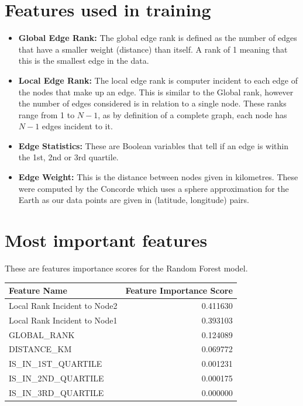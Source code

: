 \documentclass[]{UCD_CS_FYP_Report}
\begin{document}
\section{Features used in training}
\begin{itemize}
    \item \textbf{Global Edge Rank: \newline}
        The global edge rank is defined as the number of edges that have a smaller weight (distance) than itself. A rank of 1 meaning that this is the smallest edge in the data.
    \item \textbf{Local Edge Rank: \newline}
        The local edge rank is computer incident to each edge of the nodes that make up an edge. This is similar to the Global rank, however the number of edges considered is in relation to a single node. These ranks range from 1 to $N-1$, as by definition of a complete graph, each node has $N-1$ edges incident to it.
    \item \textbf{Edge Statistics: \newline}
        These are Boolean variables that tell if an edge is within the 1st, 2nd or 3rd quartile.
    \item \textbf{Edge Weight: \newline}
        This is the distance between nodes given in kilometres. These were computed by the Concorde which uses a sphere approximation for the Earth as our data points are given in (latitude, longitude) pairs.
\end{itemize}

\section{Most important features}
These are features importance scores for the Random Forest model.
\begin{center}
\begin{tabular}{lr}
\toprule
\textbf{Feature Name} &  \textbf{Feature Importance Score} \\
\midrule
Local Rank Incident to Node2 &                  0.411630 \\
Local Rank Incident to Node1 &                  0.393103 \\
GLOBAL\_RANK                  &                  0.124089 \\
DISTANCE\_KM                  &                  0.069772 \\
IS\_IN\_1ST\_QUARTILE           &                  0.001231 \\
IS\_IN\_2ND\_QUARTILE           &                  0.000175 \\
IS\_IN\_3RD\_QUARTILE           &                  0.000000 \\
\bottomrule
\end{tabular}
\end{center}
\end{document}
